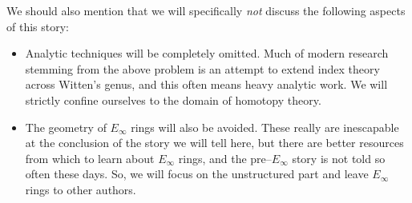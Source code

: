 We should also mention that we will specifically \emph{not} discuss the following aspects of this story:
\begin{itemize}
\item Analytic techniques will be completely omitted.  Much of modern research stemming from the above problem is an attempt to extend index theory across Witten's genus, and this often means heavy analytic work.  We will strictly confine ourselves to the domain of homotopy theory.
\item The geometry of $E_\infty$ rings will also be avoided.  These really are inescapable at the conclusion of the story we will tell here, but there are better resources from which to learn about $E_\infty$ rings, and the pre--$E_\infty$ story is not told so often these days.  So, we will focus on the unstructured part and leave $E_\infty$ rings to other authors.
\end{itemize}



